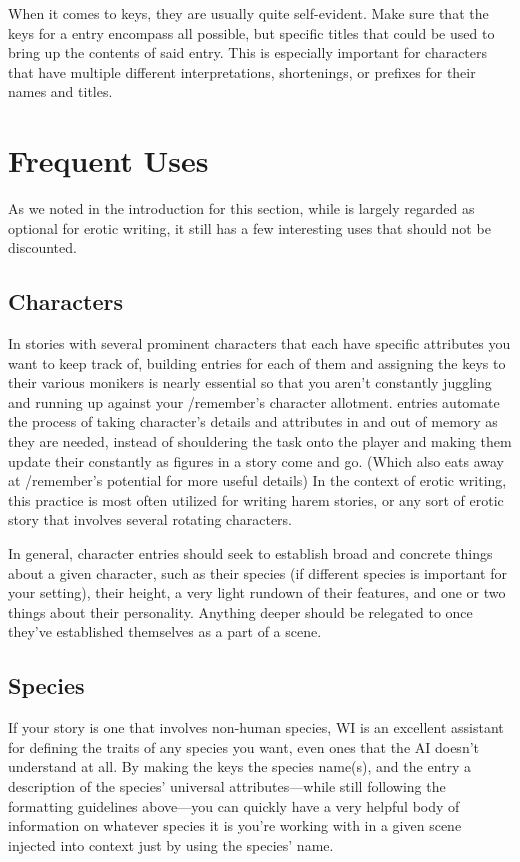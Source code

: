﻿\documentclass[Coomer-main.tex]{subfiles}
\begin{document}
When it comes to keys, they are usually quite self-evident.
Make sure that the keys for a \wi entry encompass all possible, but specific titles that could be used to bring up the contents of said entry.
This is especially important for characters that have multiple different interpretations, shortenings, or prefixes for their names and titles.

\section{Frequent Uses}

As we noted in the introduction for this section, while \wi is largely regarded as optional for erotic writing, it still has a few interesting uses that should not be discounted.

\subsection{Characters}

In stories with several prominent characters that each have specific attributes you want to keep track of, building \wi entries for each of them and assigning the keys to their various monikers is nearly essential so that you aren’t constantly juggling and running up against your /remember’s character allotment. \wi entries automate the process of taking character’s details and attributes in and out of memory as they are needed, instead of shouldering the task onto the player and making them update their \rem constantly as figures in a story come and go. (Which also eats away at /remember’s potential for more useful details) In the context of erotic writing, this practice is most often utilized for writing harem stories, or any sort of erotic story that involves several rotating characters.

In general, character entries should seek to establish broad and concrete things about a given character, such as their species (if different species is important for your setting), their height, a very light rundown of their features, and one or two things about their personality.
Anything deeper should be relegated to \rem once they've established themselves as a part of a scene.

\subsection{Species}

If your story is one that involves non-human species, WI is an excellent assistant for defining the traits of any species you want, even ones that the AI doesn't understand at all.
By making the keys the species name(s), and the entry a description of the species' universal attributes—while still following the formatting guidelines above—you can quickly have a very helpful body of information on whatever species it is you're working with in a given scene injected into context just by using the species' name.
\end{document}
